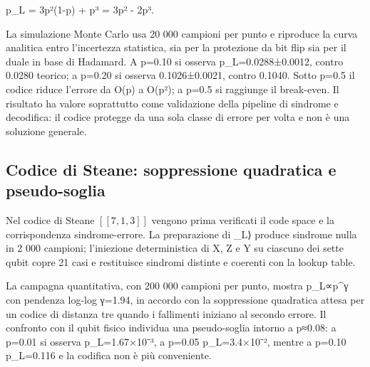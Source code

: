 p\_L = 3p²(1-p) + p³ = 3p² - 2p³.

La simulazione Monte Carlo usa 20 000 campioni per punto e riproduce la curva analitica entro l'incertezza statistica, sia per la protezione da bit flip sia per il duale in base di Hadamard. A p=0.10 si osserva p\_L=0.0288±0.0012, contro 0.0280 teorico; a p=0.20 si osserva 0.1026±0.0021, contro 0.1040. Sotto p=0.5 il codice riduce l'errore da O(p) a O(p²); a p=0.5 si raggiunge il break-even. Il risultato ha valore soprattutto come validazione della pipeline di sindrome e decodifica: il codice protegge da una sola classe di errore per volta e non è una soluzione generale.

\subsection{Codice di Steane: soppressione quadratica e pseudo-soglia}\label{sec:finale_5_2_2}\label{sec:steane}

Nel codice di Steane \ensuremath{[[7,1,3]]} vengono prima verificati il code space e la corrispondenza sindrome-errore. La preparazione di \_L⟩ produce sindrome nulla in 2 000 campioni; l'iniezione deterministica di X, Z e Y su ciascuno dei sette qubit copre 21 casi e restituisce sindromi distinte e coerenti con la lookup table.

La campagna quantitativa, con 200 000 campioni per punto, mostra p\_L∝p\^{}γ con pendenza log-log γ=1.94, in accordo con la soppressione quadratica attesa per un codice di distanza tre quando i fallimenti iniziano al secondo errore. Il confronto con il qubit fisico individua una pseudo-soglia intorno a p≈0.08: a p=0.01 si osserva p\_L=1.67×10⁻³, a p=0.05 p\_L=3.4×10⁻², mentre a p=0.10 p\_L=0.116 e la codifica non è più conveniente.


